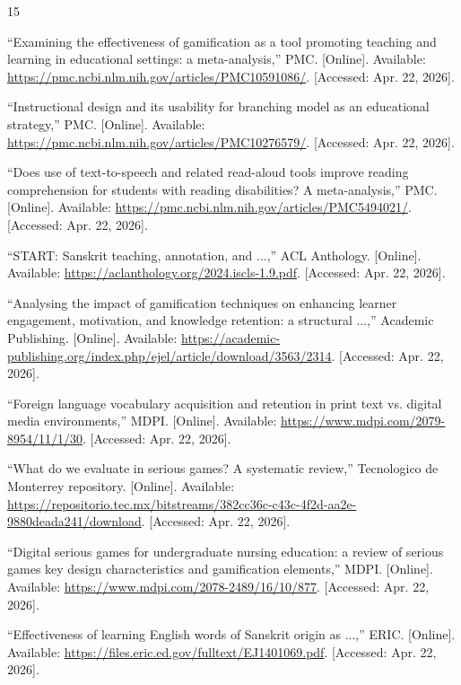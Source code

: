 \documentclass[conference]{IEEEtran}
\begin{document}
\begin{thebibliography}{15}

``Examining the effectiveness of gamification as a tool promoting teaching and learning in educational settings: a meta-analysis,'' PMC. [Online]. Available: \url{https://pmc.ncbi.nlm.nih.gov/articles/PMC10591086/}. [Accessed: Apr. 22, 2026].

``Instructional design and its usability for branching model as an educational strategy,'' PMC. [Online]. Available: \url{https://pmc.ncbi.nlm.nih.gov/articles/PMC10276579/}. [Accessed: Apr. 22, 2026].

``Does use of text-to-speech and related read-aloud tools improve reading comprehension for students with reading disabilities? A meta-analysis,'' PMC. [Online]. Available: \url{https://pmc.ncbi.nlm.nih.gov/articles/PMC5494021/}. [Accessed: Apr. 22, 2026].

``START: Sanskrit teaching, annotation, and ...,'' ACL Anthology. [Online]. Available: \url{https://aclanthology.org/2024.iscls-1.9.pdf}. [Accessed: Apr. 22, 2026].

``Analysing the impact of gamification techniques on enhancing learner engagement, motivation, and knowledge retention: a structural ...,'' Academic Publishing. [Online]. Available: \url{https://academic-publishing.org/index.php/ejel/article/download/3563/2314}. [Accessed: Apr. 22, 2026].

``Foreign language vocabulary acquisition and retention in print text vs. digital media environments,'' MDPI. [Online]. Available: \url{https://www.mdpi.com/2079-8954/11/1/30}. [Accessed: Apr. 22, 2026].

``What do we evaluate in serious games? A systematic review,'' Tecnologico de Monterrey repository. [Online]. Available: \url{https://repositorio.tec.mx/bitstreams/382cc36c-c43c-4f2d-aa2e-9880deada241/download}. [Accessed: Apr. 22, 2026].

``Digital serious games for undergraduate nursing education: a review of serious games key design characteristics and gamification elements,'' MDPI. [Online]. Available: \url{https://www.mdpi.com/2078-2489/16/10/877}. [Accessed: Apr. 22, 2026].

``Effectiveness of learning English words of Sanskrit origin as ...,'' ERIC. [Online]. Available: \url{https://files.eric.ed.gov/fulltext/EJ1401069.pdf}. [Accessed: Apr. 22, 2026].


\end{thebibliography}
\end{document}
